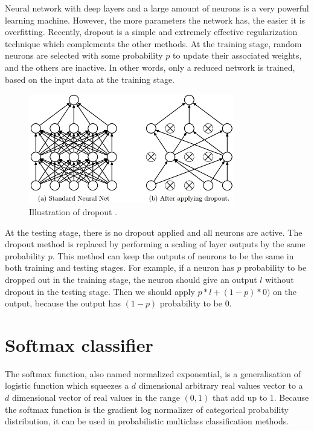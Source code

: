 Neural network with deep layers and a large amount of neurons is a very powerful learning machine. However, the more parameters the network has, the easier it is overfitting. Recently, dropout\citep{srivastava2014dropout} is a simple and extremely effective regularization technique which complements the other methods. At the training stage, random neurons are selected with some probability $p$ to update their associated weights, and the others are inactive. In other words, only a reduced network is trained, based on the input data at the training stage. 
\graphicspath{ {./Figures/} }
\begin{figure}[!htb]
\centering
\includegraphics[width=0.8\textwidth]{dropout.jpeg}
\caption{\label{fig:Dropout}Illustration of dropout \citep{srivastava2014dropout}.}
\end{figure}
At the testing stage, there is no dropout applied and all neurons are active. The dropout method is replaced by performing a scaling of layer outputs by the same probability $p$. This method can keep the outputs of neurons to be the same in both training and testing stages. For example, if a neuron has $p$ probability to be dropped out in the training stage, the neuron should give an output $l$ without dropout in the testing stage. Then we should apply $p\ast l + (1 - p)\ast 0)$ on the output, because the output has $(1-p)$ probability to be $0$.

\section{Softmax classifier}

The softmax function, also named normalized exponential, is a generalisation of logistic function which squeezes a $d$ dimensional arbitrary real values vector to a $d$ dimensional vector of real values in the range $(0,1)$ that add up to 1. Because the softmax function is the gradient log normalizer of categorical probability distribution, it can be used in probabilistic multiclass classification methods.

